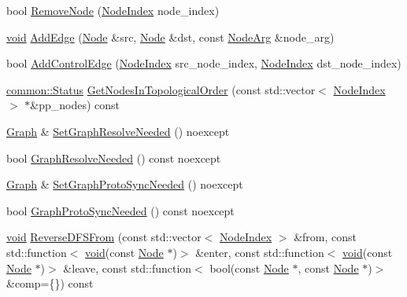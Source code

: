 \begin{DoxyCompactItemize}
\item 
bool \mbox{\hyperlink{classonnxruntime_1_1Graph_a44fd12c96e89cbdd1517ae959069d7e1}{Remove\+Node}} (\mbox{\hyperlink{namespaceonnxruntime_af8773b5c12b5d8fd9292eb2e268df760}{Node\+Index}} node\+\_\+index)
\item 
\mbox{\hyperlink{mlasi_8h_a88f941d423cb2a819b70a1358982b1a6}{void}} \mbox{\hyperlink{classonnxruntime_1_1Graph_a1f29d2bd901e3bb473c964ff711aa724}{Add\+Edge}} (\mbox{\hyperlink{classonnxruntime_1_1Node}{Node}} \&src, \mbox{\hyperlink{classonnxruntime_1_1Node}{Node}} \&dst, const \mbox{\hyperlink{classonnxruntime_1_1NodeArg}{Node\+Arg}} \&node\+\_\+arg)
\item 
bool \mbox{\hyperlink{classonnxruntime_1_1Graph_aa348aa7dc35abaeb91399992122e9b11}{Add\+Control\+Edge}} (\mbox{\hyperlink{namespaceonnxruntime_af8773b5c12b5d8fd9292eb2e268df760}{Node\+Index}} src\+\_\+node\+\_\+index, \mbox{\hyperlink{namespaceonnxruntime_af8773b5c12b5d8fd9292eb2e268df760}{Node\+Index}} dst\+\_\+node\+\_\+index)
\item 
\mbox{\hyperlink{classonnxruntime_1_1common_1_1Status}{common\+::\+Status}} \mbox{\hyperlink{classonnxruntime_1_1Graph_afaf08ac8665824c22b979927e02fb2e4}{Get\+Nodes\+In\+Topological\+Order}} (const std\+::vector$<$ \mbox{\hyperlink{namespaceonnxruntime_af8773b5c12b5d8fd9292eb2e268df760}{Node\+Index}} $>$ $\ast$\&pp\+\_\+nodes) const
\item 
\mbox{\hyperlink{classonnxruntime_1_1Graph}{Graph}} \& \mbox{\hyperlink{classonnxruntime_1_1Graph_abd668cfb112919d34b6260ebb2084742}{Set\+Graph\+Resolve\+Needed}} () noexcept
\item 
bool \mbox{\hyperlink{classonnxruntime_1_1Graph_af84afc5b0cb3876c1860c19c4ea249d7}{Graph\+Resolve\+Needed}} () const noexcept
\item 
\mbox{\hyperlink{classonnxruntime_1_1Graph}{Graph}} \& \mbox{\hyperlink{classonnxruntime_1_1Graph_a086860d8eaa4f562e97d0ebbec731819}{Set\+Graph\+Proto\+Sync\+Needed}} () noexcept
\item 
bool \mbox{\hyperlink{classonnxruntime_1_1Graph_ae1709643bf3a2f41c7ef59b532590a0f}{Graph\+Proto\+Sync\+Needed}} () const noexcept
\item 
\mbox{\hyperlink{mlasi_8h_a88f941d423cb2a819b70a1358982b1a6}{void}} \mbox{\hyperlink{classonnxruntime_1_1Graph_a1b4379710f3916fd237e2692c130ddd5}{Reverse\+D\+F\+S\+From}} (const std\+::vector$<$ \mbox{\hyperlink{namespaceonnxruntime_af8773b5c12b5d8fd9292eb2e268df760}{Node\+Index}} $>$ \&from, const std\+::function$<$ \mbox{\hyperlink{mlasi_8h_a88f941d423cb2a819b70a1358982b1a6}{void}}(const \mbox{\hyperlink{classonnxruntime_1_1Node}{Node}} $\ast$)$>$ \&enter, const std\+::function$<$ \mbox{\hyperlink{mlasi_8h_a88f941d423cb2a819b70a1358982b1a6}{void}}(const \mbox{\hyperlink{classonnxruntime_1_1Node}{Node}} $\ast$)$>$ \&leave, const std\+::function$<$ bool(const \mbox{\hyperlink{classonnxruntime_1_1Node}{Node}} $\ast$, const \mbox{\hyperlink{classonnxruntime_1_1Node}{Node}} $\ast$)$>$ \&comp=\{\}) const

\end{DoxyCompactItemize}
